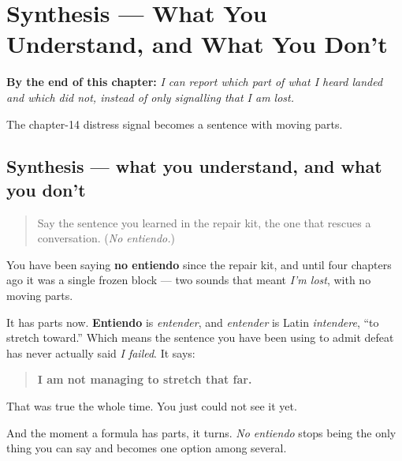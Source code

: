 
\chapter{Synthesis --- What You Understand, and What You Don't}
\label{ch:spanish-synthesis-verbs-of-mind}

\begin{chapteropening}
\textbf{By the end of this chapter:} \emph{I can report which part of what I heard landed and which did not, instead of only signalling that I am lost.}

The chapter-14 distress signal becomes a sentence with moving parts.
\end{chapteropening}

\section[Practice]{Synthesis — what you understand, and what you don't}

\label{lesson:ES-C34-sintesis-mente}



\begin{quote}
Say the sentence you learned in the repair kit, the one that rescues a conversation. (\emph{No entiendo.})
\end{quote}

\begin{grammarlens}[title={Grammar Lens: the formula was a verb all along}]
You have been saying \textbf{no entiendo} since the repair kit, and until four chapters ago it was a single frozen block — two sounds that meant \emph{I'm lost}, with no moving parts.

It has parts now. \textbf{Entiendo} is \emph{entender}, and \emph{entender} is Latin \emph{intendere}, \textquotedblleft{}to stretch toward.\textquotedblright{} Which means the sentence you have been using to admit defeat has never actually said \emph{I failed}. It says:

\begin{quote}
\textbf{I am not managing to stretch that far.}
\end{quote}

That was true the whole time. You just could not see it yet.

And the moment a formula has parts, it turns. \emph{No entiendo} stops being the only thing you can say and becomes one option among several.
\end{grammarlens}

